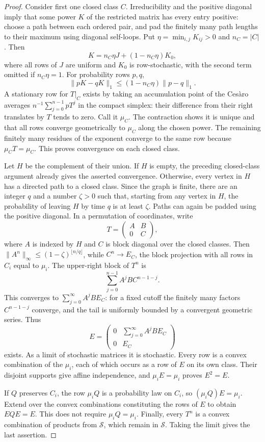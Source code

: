 \begin{proof}
Consider first one closed class $C$. Irreducibility and the positive
diagonal imply that some power $K$ of the restricted matrix has every
entry positive: choose a path between each ordered pair, and pad the
finitely many path lengths to their maximum using diagonal self-loops.
Put $\eta=\min_{i,j}K_{ij}>0$ and $n_C=|C|$. Then
\[
 K=n_C\eta J+(1-n_C\eta)K_0,
\]
where all rows of $J$ are uniform and $K_0$ is row-stochastic, with the
second term omitted if $n_C\eta=1$. For probability rows $p,q$,
\[
 \|pK-qK\|_1\le(1-n_C\eta)\|p-q\|_1.
\]
A stationary row for $T|_C$ exists by taking an accumulation point of the
Ces\`aro averages $n^{-1}\sum_{j=0}^{n-1}pT^j$ in the compact simplex:
their difference from their right translates by $T$ tends to zero.
Call it $\mu_C$. The contraction shows it is unique and that all rows
converge geometrically to $\mu_C$ along the chosen power. The remaining
finitely many residues of the exponent converge to the same row because
$\mu_CT=\mu_C$. This proves convergence on each closed class.

Let $H$ be the complement of their union. If $H$ is empty, the preceding
closed-class argument already gives the asserted convergence. Otherwise,
every vertex in $H$ has a
directed path to a closed class. Since the graph is finite, there are
an integer $q$ and a number $\zeta>0$ such that, starting from any vertex
in $H$, the probability of leaving $H$ by time $q$ is at least $\zeta$.
Paths can again be padded using the positive diagonal. In a permutation
of coordinates, write
\[
 T=\begin{pmatrix}A&B\\0&C\end{pmatrix},
\]
where $A$ is indexed by $H$ and $C$ is block diagonal over the closed
classes. Then $\|A^n\|_\infty\le(1-\zeta)^{\lfloor n/q\rfloor}$, while
$C^n\to E_C$, the block projection with all rows in $C_i$ equal to
$\mu_i$. The upper-right block of $T^n$ is
\[
 \sum_{j=0}^{n-1}A^jBC^{n-1-j}.
\]
This converges to $\sum_{j=0}^\infty A^jBE_C$: for a fixed cutoff the
finitely many factors $C^{n-1-j}$ converge, and the tail is uniformly
bounded by a convergent geometric series. Thus
\[
 E=\begin{pmatrix}0&\sum_{j=0}^\infty A^jBE_C\\0&E_C\end{pmatrix}
\]
exists. As a limit of stochastic matrices it is stochastic. Every row
is a convex combination of the $\mu_i$, each of which occurs as a row
of $E$ on its own class. Their disjoint supports give affine independence,
and $\mu_iE=\mu_i$ proves $E^2=E$.

If $Q$ preserves $C_i$, the row $\mu_iQ$ is a probability law on $C_i$,
so $(\mu_iQ)E=\mu_i$. Extend over the convex combinations constituting
the rows of $E$ to obtain $EQE=E$. This does not require $\mu_iQ=\mu_i$.
Finally, every $T^n$ is a convex combination of products from
$\mathcal S$, which remain in $\mathcal S$. Taking the limit gives
the last assertion.
\end{proof}

